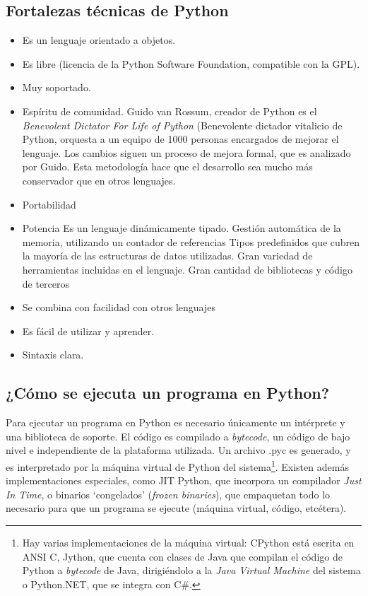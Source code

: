 \documentclass[12pt]{article} %
\begin{document}
\subsection{Fortalezas técnicas de Python}
\begin{itemize}
	\item Es un lenguaje orientado a objetos.
	\item Es libre (licencia de la Python Software Foundation, compatible con la GPL).
	\item Muy soportado.
	\item Espíritu de comunidad.
		Guido van Rossum, creador de Python es el \textit{Benevolent Dictator For Life of Python} (Benevolente dictador vitalicio de Python, orquesta a un equipo de 1000 personas encargados de mejorar el lenguaje. Los cambios siguen un proceso de mejora formal, que es analizado por Guido. Esta metodología hace que el desarrollo sea mucho más conservador que en otros lenguajes.
	\item Portabilidad
	\item Potencia
		\subitem Es un lenguaje dinámicamente tipado.
		\subitem Gestión automática de la memoria, utilizando un contador de referencias
		\subitem Tipos predefinidos que cubren la mayoría de las estructuras de datos utilizadas.
		\subitem Gran variedad de herramientas incluidas en el lenguaje.
		\subitem Gran cantidad de bibliotecas y código de terceros
	\item Se combina con facilidad con otros lenguajes
	\item Es fácil de utilizar y aprender.
	\item Sintaxis clara.
\end{itemize}

\subsection{¿Cómo se ejecuta un programa en Python?} %

Para ejecutar un programa en Python es necesario únicamente un intérprete y una biblioteca de soporte. El código es compilado a \textit{bytecode}, un código de bajo nivel e independiente de la plataforma utilizada. Un archivo .pyc es generado, y es interpretado por la máquina virtual de Python del sistema\footnote{Hay varias implementaciones de la máquina virtual: CPython está escrita en ANSI C, Jython, que cuenta con clases de Java que compilan el código de Python a \textit{bytecode} de Java, dirigiéndolo a la \textit{Java Virtual Machine} del sistema o Python.NET, que se integra con C\#.}.
Existen además implementaciones especiales, como JIT Python, que incorpora un compilador \textit{Just In Time}, o binarios `congelados' (\textit{frozen binaries}), que empaquetan todo lo necesario para que un programa se ejecute (máquina virtual, código, etcétera).
\end{document}
